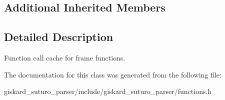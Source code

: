 \subsection*{Additional Inherited Members}


\subsection{Detailed Description}
Function call cache for frame functions. 

The documentation for this class was generated from the following file\-:\begin{DoxyCompactItemize}
\item 
giskard\-\_\-suturo\-\_\-parser/include/giskard\-\_\-suturo\-\_\-parser/functions.\-h\end{DoxyCompactItemize}
